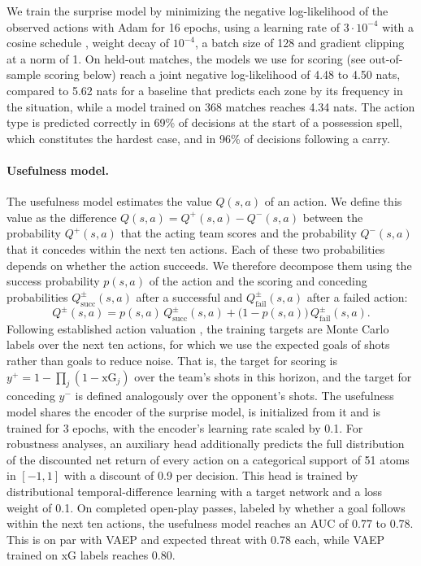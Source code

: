 We train the surprise model by minimizing the negative log-likelihood of the observed actions with Adam
\parencite{kingma2015adam} for 16 epochs, using a learning rate of $3\cdot10^{-4}$ with a cosine schedule
\parencite{loshchilov2017sgdr}, weight decay of $10^{-4}$, a batch size of 128 and gradient clipping at a norm of 1.
On held-out matches, the models we use for scoring (see out-of-sample scoring below) reach a joint negative
log-likelihood of 4.48 to 4.50 nats, compared to 5.62 nats for a baseline that predicts each zone by its frequency in
the situation, while a model trained on 368 matches reaches 4.34 nats. The action type is predicted correctly in
69\% of decisions at the start of a possession spell, which constitutes the hardest case, and in 96\% of decisions
following a carry.

\paragraph{Usefulness model.} The usefulness model estimates the value $Q(s,a)$ of an action. We define this value as
the difference $Q(s,a) = Q^{+}(s,a) - Q^{-}(s,a)$ between the probability $Q^{+}(s,a)$ that the acting team scores and
the probability $Q^{-}(s,a)$ that it concedes within the next ten actions. Each of these two probabilities depends on
whether the action succeeds. We therefore decompose them using the success probability $p(s,a)$ of the action and the
scoring and conceding probabilities $Q^{\pm}_{\text{succ}}(s,a)$ after a successful and $Q^{\pm}_{\text{fail}}(s,a)$
after a failed action:
\begin{equation*}
Q^{\pm}(s,a) = p(s,a)\, Q^{\pm}_{\text{succ}}(s,a) + \big(1-p(s,a)\big)\, Q^{\pm}_{\text{fail}}(s,a).
\end{equation*}
Following established action valuation \parencite{decroos2019actions}, the training targets are Monte Carlo labels
over the next ten actions, for which we use the expected goals of shots rather than goals to reduce noise. That is,
the target for scoring is $y^{+} = 1-\prod_j (1-\text{xG}_j)$ over the team's shots in this horizon, and the target
for conceding $y^{-}$ is defined analogously over the opponent's shots. The usefulness model shares the encoder of the
surprise model, is initialized from it and is trained for 3 epochs, with the encoder's learning rate scaled by 0.1.
For robustness analyses, an auxiliary head additionally predicts the full distribution of the discounted net return
of every action on a categorical support of 51 atoms in $[-1, 1]$ with a discount of 0.9 per decision. This head is
trained by distributional temporal-difference learning \parencite{bellemare2017distributional} with a target network
\parencite{mnih2015human} and a loss weight of 0.1. On completed open-play passes, labeled by whether a goal follows
within the next ten actions, the usefulness model reaches an AUC of 0.77 to 0.78. This is on par with VAEP \parencite{decroos2019actions} and expected
threat \parencite[xT;][]{singh2018expected} with 0.78 each, while VAEP trained on xG labels reaches 0.80.


